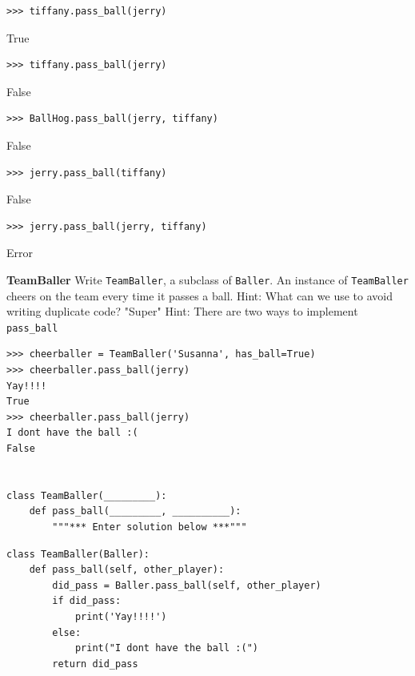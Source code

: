 \documentclass{exam}
\begin{document}
\begin{questions}
\begin{blocksection}
\begin{lstlisting}
>>> tiffany.pass_ball(jerry)
\end{lstlisting}
\begin{solution}[.2in]
True
\end{solution}

\begin{lstlisting}
>>> tiffany.pass_ball(jerry)
\end{lstlisting}
\begin{solution}[.2in]
False
\end{solution}

\begin{lstlisting}
>>> BallHog.pass_ball(jerry, tiffany)
\end{lstlisting}
\begin{solution}[.2in]
False
\end{solution}

\begin{lstlisting}
>>> jerry.pass_ball(tiffany)
\end{lstlisting}
\begin{solution}[.2in]
False
\end{solution}

\begin{lstlisting}
>>> jerry.pass_ball(jerry, tiffany)
\end{lstlisting}
\begin{solution}[.2in]
Error
\end{solution}
\end{blocksection}

\begin{blocksection}
\question \textbf{TeamBaller} \newline
Write \texttt{TeamBaller}, a subclass of \texttt{Baller}. An instance of \texttt{TeamBaller} cheers on the team every time it passes a ball.  \newline
Hint: What can we use to avoid writing duplicate code? \newline
"Super" Hint: There are two ways to implement \texttt{pass\_ball} \newline

\begin{lstlisting}
>>> cheerballer = TeamBaller('Susanna', has_ball=True)
>>> cheerballer.pass_ball(jerry)
Yay!!!!
True
>>> cheerballer.pass_ball(jerry)
I dont have the ball :(
False


class TeamBaller(_________):
    def pass_ball(_________, __________):
        """*** Enter solution below ***"""
\end{lstlisting}
\begin{solution}[1in]
\begin{lstlisting}
class TeamBaller(Baller):
    def pass_ball(self, other_player):
        did_pass = Baller.pass_ball(self, other_player)
        if did_pass:
            print('Yay!!!!')
        else:
            print("I dont have the ball :(")
        return did_pass
\end{lstlisting}
\end{solution}
\end{blocksection}


\end{questions}
\end{document}
